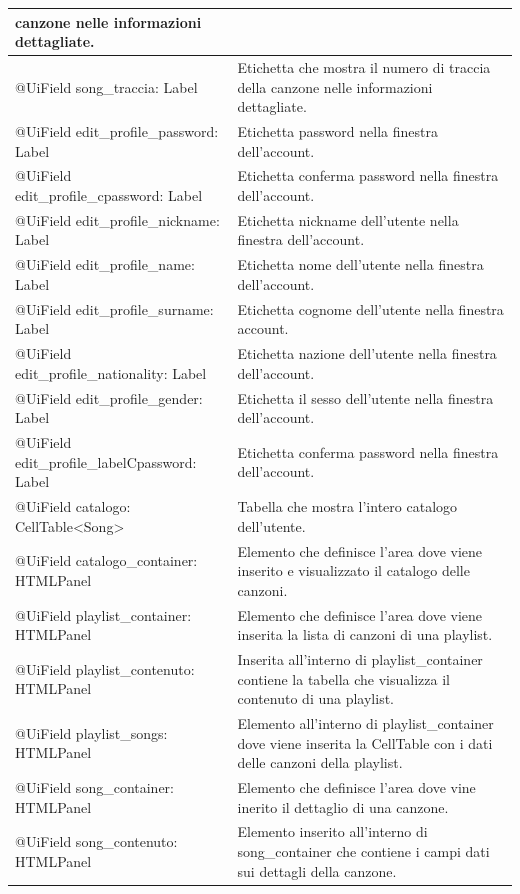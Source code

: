 \begin{longtable}{|p{}|p{}|}
canzone nelle informazioni dettagliate.\\\hline
@UiField song\_traccia: Label & Etichetta che mostra il numero di
traccia della canzone nelle informazioni dettagliate.\\\hline
@UiField edit\_profile\_password: Label & Etichetta 
password nella finestra dell'account.\\\hline
@UiField edit\_profile\_cpassword: Label & Etichetta 
conferma password nella finestra dell'account.\\\hline
@UiField edit\_profile\_nickname: Label & Etichetta nickname
dell'utente nella finestra dell'account.\\\hline
@UiField edit\_profile\_name: Label & Etichetta  nome
dell'utente nella finestra dell'account.\\\hline
@UiField edit\_profile\_surname: Label & Etichetta cognome
dell'utente nella finestra account.\\\hline
@UiField edit\_profile\_nationality: Label & Etichetta 
nazione dell'utente nella finestra dell'account.\\\hline
@UiField edit\_profile\_gender: Label & Etichetta il sesso
dell'utente nella finestra dell'account.\\\hline
@UiField edit\_profile\_labelCpassword: Label & Etichetta conferma
password nella finestra dell'account.\\\hline
@UiField catalogo: CellTable\textless Song\textgreater & Tabella che
mostra l'intero catalogo dell'utente.\\\hline
@UiField catalogo\_container: HTMLPanel & Elemento che definisce l'area
dove viene inserito e visualizzato il catalogo delle canzoni.\\\hline
@UiField playlist\_container: HTMLPanel & Elemento che definisce l'area
dove viene inserita la lista di canzoni di una playlist.\\\hline
@UiField playlist\_contenuto: HTMLPanel & Inserita all'interno di
playlist\_container contiene la tabella che visualizza il contenuto di
una playlist.\\\hline
@UiField playlist\_songs: HTMLPanel & Elemento all'interno di
playlist\_container dove viene inserita la CellTable con i dati delle
canzoni della playlist.\\\hline
@UiField song\_container: HTMLPanel & Elemento che definisce l'area dove
vine inerito il dettaglio di una canzone.\\\hline
@UiField song\_contenuto: HTMLPanel & Elemento inserito all'interno di
song\_container che contiene i campi dati sui dettagli della canzone.\\\hline

\end{longtable}
